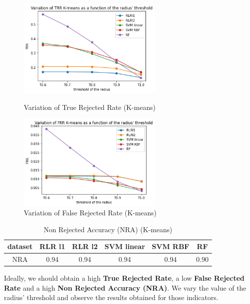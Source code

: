 \documentclass{siamart171218}
\begin{document}
\begin{figure}[h]
    \begin{minipage}[c]{.46\linewidth}
        \centering
        \includegraphics[width=7cm]{images/TRR_Kmeans.png}
        \caption{Variation of True Rejected Rate (K-means)}
        \label{TRR_Kmeans}
    \end{minipage}
    \hfill
    \begin{minipage}[c]{.46\linewidth}
        \centering
        \includegraphics[width=7cm]{images/FRR_Kmeans.png}
        \caption{Variation of False Rejected Rate (K-means)}
        \label{FRR_Kmeans}
    \end{minipage}
    \hfill
\end{figure}

\begin{table}[h!]
\centering
\caption{Non Rejected Accuracy (NRA) (K-means)} 
\begin{tabular}{|c ||c c c c c|} 
 \hline
  dataset  & RLR l1 & RLR l2 & SVM linear & SVM RBF & RF \\
 \hline\hline
 NRA & 0.94 & 0.94 & 0.94 & 0.94 & 0.90 \\
 \hline
\end{tabular}

\label{NRA_Kmeans}
\end{table}

Ideally, we should obtain a high \textbf{True Rejected Rate}, a low \textbf{False Rejected Rate} and a high \textbf{Non Rejected Accuracy (NRA)}. 
We vary the value of the radius' threshold and observe the results obtained for those indicators. \\
\end{document}
